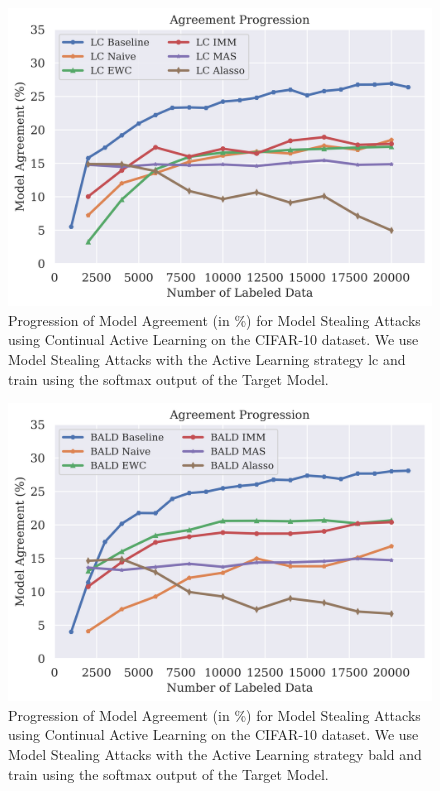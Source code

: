 \begin{figure}[h]
    \centering
    \includegraphics[width=0.7\linewidth]{images/results_CALMS/cifar100_softmax_lc.png}
    \caption[Agreement Comparison for Model Stealing on CIFAR10 using the softmax output and the Active Learning strategy LC]{Progression of Model Agreement
    (in \%) for Model Stealing Attacks using Continual Active Learning on the CIFAR-10 dataset. We use Model Stealing Attacks with the Active Learning strategy
    \gls{lc} and train using the softmax output of the Target Model.}
    \label{fig:CALMSCIFAR10SoftmaxLC}
\end{figure}

\begin{figure}[h]
    \centering
    \includegraphics[width=0.7\linewidth]{images/results_CALMS/cifar100_softmax_bald.png}
    \caption[Agreement Comparison for Model Stealing on CIFAR10 using the softmax output and the Active Learning strategy BALD]{Progression of Model Agreement
    (in \%) for Model Stealing Attacks using Continual Active Learning on the CIFAR-10 dataset. We use Model Stealing Attacks with the Active Learning strategy
    \gls{bald} and train using the softmax output of the Target Model.}
    \label{fig:CALMSCIFAR10SoftmaxBALD}
\end{figure}

